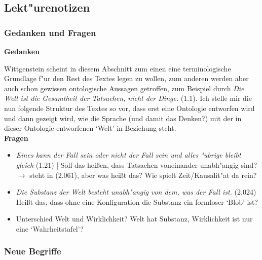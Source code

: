 \documentclass[emulatestandardclasses]{scrartcl}
\begin{document}
\subsection{Lekt"urenotizen}
\subsubsection{Gedanken und Fragen}
\textbf{Gedanken}

Wittgenstein scheint in diesem Abschnitt zum einen eine terminologische Grundlage f"ur den Rest des Textes legen zu wollen, zum anderen werden aber auch schon gewissen ontologische Aussagen getroffen, zum Beispiel durch \emph{Die Welt ist die Gesamtheit der Tatsachen, nicht der Dinge.} (1.1). Ich stelle mir die nun folgende Struktur des Textes so vor, dass erst eine Ontologie entworfen wird und dann gezeigt wird, wie die Sprache (und damit das Denken?) mit der in dieser Ontologie entworfenen `Welt' in Beziehung steht. \newline
\\
\textbf{Fragen}

\begin{itemize}
  \item \emph{Eines kann der Fall sein oder nicht der Fall sein und alles "ubrige bleibt gleich} (1.21) | Soll das hei\ss en, dass Tatsachen voneinander unabh"angig sind? $\rightarrow$ steht in (2.061), aber was hei\ss t das? Wie spielt Zeit/Kausalit"at da rein?
  \item \emph{Die Substanz der Welt besteht unabh"angig von dem, was der Fall ist.} (2.024) Hei\ss t das, dass ohne eine Konfiguration die Substanz ein formloser `Blob' ist?
  \item Unterschied Welt und Wirklichkeit? Welt hat Substanz, Wirklichkeit ist nur eine `Wahrheitstafel'? 
\end{itemize}

\vspace{10pt}
\subsubsection{Neue Begriffe}
\end{document}
